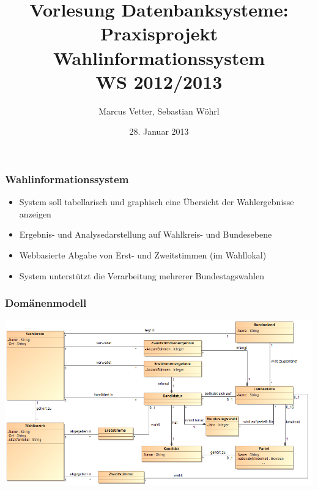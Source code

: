 \documentclass{beamer}
\title[WIS]{Vorlesung Datenbanksysteme: \\ Praxisprojekt \\ Wahlinformationssystem \\ WS 2012/2013}
\author{Marcus Vetter, Sebastian Wöhrl}
\date{28. Januar 2013}
\begin{document}
\frame{\titlepage}

\begin{frame}
\frametitle{Wahlinformationssystem}
\begin{itemize}
\item System soll tabellarisch und graphisch eine Übersicht der Wahlergebnisse anzeigen
\item Ergebnis- und Analysedarstellung auf Wahlkreis- und Bundesebene
\item Webbasierte Abgabe von Erst- und Zweitstimmen (im Wahllokal)
\item System unterstützt die Verarbeitung mehrerer Bundestagswahlen
\end{itemize}
\end{frame}

\begin{frame}
\frametitle{Domänenmodell}
\includegraphics[scale=0.34]{cd_wahlinformationssystem.png}
\end{frame}
\end{document}
